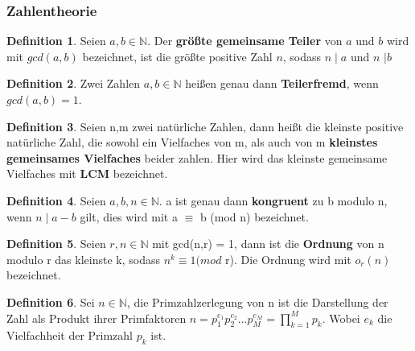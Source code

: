 \documentclass[12pt,oneside]{article}
\theoremstyle{remark}
\theoremstyle{definition}
\newtheorem{definition}{Definition}[section]
\begin{document}
\subsubsection{Zahlentheorie}
\theoremstyle{definition}
\begin{definition}\label{Df_1}
Seien $a,b \in \mathbb{N}$. Der \textbf{größte gemeinsame Teiler} von $a$ und $b$ wird mit $gcd(a,b)$ bezeichnet, ist die größte positive Zahl $n$, sodass $n \mid a$ und $n$ $ \mid b$
\end{definition}

\smallskip 

\begin{definition}\label{Df_2}
Zwei Zahlen $a,b \in \mathbb{N}$ heißen genau dann \textbf{Teilerfremd}, wenn $gcd(a,b) = 1$.
\end{definition}

\smallskip

\begin{definition}
Seien n,m zwei natürliche Zahlen, dann heißt die kleinste positive natürliche Zahl, die sowohl ein Vielfaches von m, als auch von m \textbf{kleinstes gemeinsames Vielfaches} beider zahlen. Hier wird das kleinste gemeinsame Vielfaches mit \textbf{LCM} bezeichnet.
\end{definition}

\smallskip 

\begin{definition}\label{Df_3}
Seien $a, b, n \in \mathbb{N}$. a ist genau dann \textbf{kongruent} zu b modulo n, wenn $n \mid a - b $ gilt, dies wird mit a $\equiv$ b (mod n) bezeichnet.  
\end{definition}

\smallskip 

\begin{definition}\label{Df_4}
Seien $r,n \in \mathbb{N}$ mit gcd(n,r) = 1, dann ist die \textbf{Ordnung} von n modulo r das kleinste k, sodass $n^k \equiv 1 (mod $ r). Die Ordnung wird mit $o_{r}(n)$ bezeichnet.
\end{definition}

\smallskip


\begin{definition}\label{Df_5}
Sei $n \in \mathbb{N}$, die Primzahlzerlegung von n ist die Darstellung der Zahl als Produkt ihrer Primfaktoren \newline
$n = p_{1}^{e_{1}}p_{2}^{e_{2}}...p_{M}^{e_{M}} = \prod_{k=1}^{M} p_{k}$. Wobei $e_{k}$ die Vielfachheit der Primzahl $p_{k}$ ist.
\end{definition}
\end{document}
